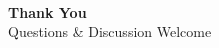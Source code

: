 \documentclass[aspectratio=169,12pt]{beamer}
\begin{document}
{\begin{frame}[plain]
\vspace{0.6cm}
\begin{center}
  {\Huge\color{accent}\faHandshake}\\[4pt]
  {\large\bfseries\color{white}Thank You}\\[4pt]
  {\footnotesize\color{white!70}Questions \& Discussion Welcome}
\end{center}
\end{frame}
}
\end{document}

